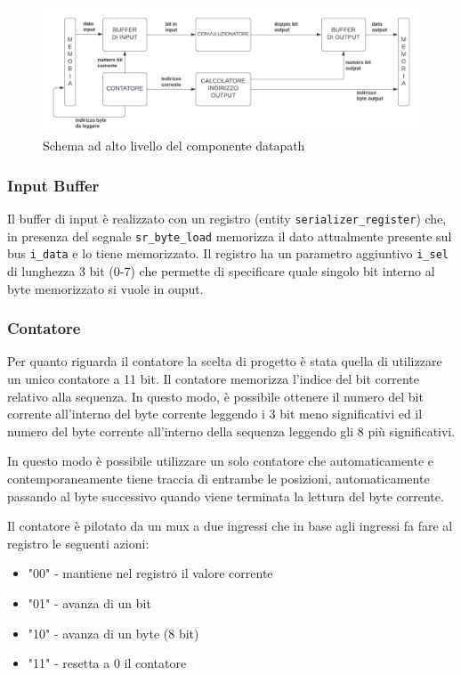 \documentclass[12pt, a4paper]{article}
\begin{document}
\begin{figure}[h!]
    \centering
    \includegraphics[scale=0.32]{datapath.png}
    \caption{Schema ad alto livello del componente datapath}
    \label{fig:datapath_small}
\end{figure}

\subsubsection{Input Buffer}

Il buffer di input è realizzato con un registro (entity \texttt{serializer\_register}) che, in presenza del segnale 
\texttt{sr\_byte\_load} memorizza il dato attualmente presente sul bus \texttt{i\_data} e lo tiene memorizzato.
Il registro ha un parametro aggiuntivo \texttt{i\_sel} di lunghezza 3 bit (0-7)
che permette di specificare quale singolo bit interno al byte memorizzato si vuole in ouput.

\subsubsection{Contatore}

Per quanto riguarda il contatore la scelta di progetto è stata quella di utilizzare un unico contatore a 11 bit.
Il contatore memorizza l'indice del bit corrente relativo alla sequenza.
In questo modo, è possibile ottenere il numero del bit corrente all'interno del byte corrente leggendo i 3 bit meno significativi 
ed il numero del byte corrente all'interno della sequenza leggendo gli 8 più significativi.
\pagebreak

In questo modo è possibile utilizzare un solo contatore che automaticamente e contemporaneamente tiene traccia di entrambe le posizioni, 
automaticamente passando al byte successivo quando viene terminata la lettura del byte corrente.

\noindent Il contatore è pilotato da un mux a due ingressi che in base agli ingressi fa fare al registro le seguenti azioni:
\begin{itemize}[itemsep=4pt, topsep=4pt]
    \item "00" - mantiene nel registro il valore corrente
    \item "01" - avanza di un bit
    \item "10" - avanza di un byte (8 bit)
    \item "11" - resetta a 0 il contatore
\end{itemize}
\end{document}
